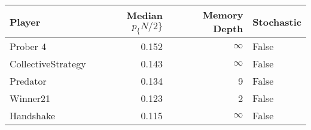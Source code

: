 \begin{tabular}{lrrl}
\toprule
             Player &  Median $p_\{N/2\}$ &  Memory Depth & Stochastic \\
\midrule
           Prober 4 &             0.152 &            \(\infty\) &      False \\
 CollectiveStrategy &             0.143 &            \(\infty\) &      False \\
           Predator &             0.134 &             9 &      False \\
           Winner21 &             0.123 &             2 &      False \\
          Handshake &             0.115 &            \(\infty\) &      False \\
\bottomrule
\end{tabular}
